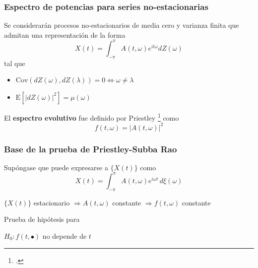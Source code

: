 \documentclass[11pt]{beamer}
\newcommand{\intPI}{\int_{-\pi}^{\pi}}
\newcommand{\E}[1]{\mathrm{E}\left[ #1 \right]}
\newcommand{\Cov}[1]{\mathrm{Cov}\left( #1 \right)}
\newcommand{\abso}[1]{\left| #1 \right|}
\begin{document}

\begin{frame}\frametitle{Espectro de potencias para series no-estacionarias}
Se considerar\'an procesos no-estacionarios \alert{de media cero y varianza finita} que admitan una 
representaci\'on de la forma
\begin{equation*}
X(t) = \intPI A(t,\omega) e^{i t \omega} dZ(\omega)
\end{equation*}
tal que 
\begin{itemize}
\item $\Cov{dZ(\omega),dZ(\lambda)} = 0 \Leftrightarrow \omega \neq \lambda$
\item $\E{\abso{dZ(\omega)}^{2}} = \mu(\omega)$
\end{itemize}

El \textbf{espectro evolutivo} fue definido por Priestley \footcite{Priestley65} como
\begin{equation*}
f(t,\omega) = \abso{A(t,\omega)}^{2}
\end{equation*}
\end{frame}


\begin{frame}\frametitle{Base de la prueba de Priestley-Subba Rao}
Sup\'ongase que puede expresarse a $\{X(t)\}$ como
\begin{equation*}
X(t) = \int_{-\pi}^{\pi} A(t,\omega) e^{i\omega t} \, d\xi(\omega)
\end{equation*}

\begin{center}
$\{ X(t) \}$ estacionario $\Rightarrow A(t,\omega)$ constante $\Rightarrow f(t,\omega)$ constante
\end{center}

\pause

Prueba de hip\'otesis para

\begin{center}
$H_0 : f(t,\bullet)$ no depende de $t$
\end{center}
\end{frame}

\end{document}
